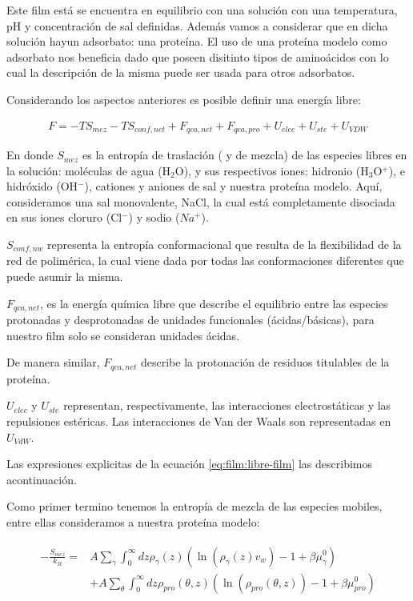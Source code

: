Este film est\'a  se encuentra en equilibrio con una soluci\'on con una temperatura, pH y concentraci\'on de sal definidas. Adem\'as vamos a considerar que en dicha soluci\'on hayun adsorbato: una prote\'ina.
El uso de una prote\'ina modelo como adsorbato nos beneficia dado que poseen disitinto tipos de amino\'acidos con lo cual la descripci\'on de la misma puede ser usada para otros adsorbatos. 


Considerando los aspectos anteriores es posible definir una energ\'ia libre:

\begin{align}
 	F = -TS_{mez} -TS_{conf,net} + F_{qca,net} + F_{qca,pro} + U_{elec} + U_{ste} + U_{VDW}
 	\label{eq:film:libre-film}
\end{align}
 
\noindent En donde $S_{mez}$ es la entrop\'ia de traslaci\'on ( y de mezcla) de las especies libres en la soluci\'on: mol\'eculas de agua (H$_2$O), y sus respectivos iones:  hidronio (H$_3$O$^+$), e hidr\'oxido (OH$^- $), cationes y aniones de sal y nuestra prote\'ina modelo.
Aqu\'i, consideramos una sal monovalente, NaCl, la cual est\'a completamente disociada en sus  iones cloruro (Cl$^-$) y sodio ($Na^+$). 

$S_{conf,nw}$ representa la entrop\'ia conformacional que resulta de la flexibilidad de la red de polim\'erica, la cual viene dada por todas las conformaciones diferentes que puede asumir la misma.

$F_{qca,net}$, es la energ\'ia qu\'imica libre que describe el equilibrio entre las especies protonadas y desprotonadas de unidades funcionales (\'acidas/b\'asicas), para nuestro film solo se consideran unidades \'acidas.

De manera similar, $F_{qca,net}$ describe la protonaci\'on de residuos titulables de la prote\'ina.

$U_{elec}$ y $U_{ste}$ representan, respectivamente, las interacciones electrost\'aticas y las repulsiones est\'ericas.
Las interacciones de Van der Waals son representadas en $U_{VdW}$.


Las expresiones explicitas de la ecuaci\'on \ref{eq:film:libre-film} las describimos acontinuaci\'on.

Como primer termino tenemos la entrop\'ia de mezcla de  las especies mobiles, entre ellas consideramos a nuestra prote\'ina modelo:

\begin{align}
	\begin{aligned}
		-\frac{S_{mez}}{k_B}= &A\sum_{\gamma}\int_0^\infty{dz\rho_\gamma(z)\left(\ln \left(\rho_\gamma (z)v_w\right) -1 + \beta\mu^0_\gamma\right)} \\
		&+ A\sum_{\theta}\int_0^\infty{dz\rho_{pro}(\theta,z)\left(\ln \left(\rho_{pro}(\theta,z)\right) -1 + \beta\mu^0_{pro} \right)}
	\end{aligned}
\end{align}

